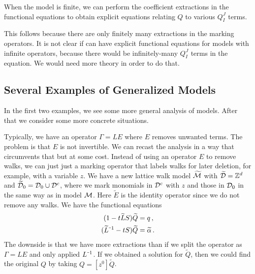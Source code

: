 \begin{cor} When the model is finite, we can perform the coefficient extractions in the functional equations to obtain explicit equations relating $Q$ to various $Q_I^J$ terms.
\end{cor}

This follows because there are only finitely many extractions in the marking operators. It is not clear if can have explicit functional equations for models with infinite operators, because there would be infinitely-many $Q_I^J$ terms in the equation. We would need more theory in order to do that.

\subsection{Several Examples of Generalized Models}

In the first two examples, we see some more general analysis of models. After that we consider some more concrete situations.

\begin{exa} Typically, we have an operator $\Gamma = LE$ where $E$ removes unwanted terms. The problem is that $E$ is not invertible. We can recast the analysis in a way that circumvents that but at some cost. Instead of using an operator $E$ to remove walks, we can just just a marking operator that labels walks for later deletion, for example, with a variable $z$. We have a new lattice walk model $\widetilde{\mathcal{M}}$ with $\widetilde{\mathcal{D}} = \mathbb{Z}^d$ and $\widetilde{\mathcal{D}}_0 = \mathcal{D}_0  \cup \mathcal{D}^c$, where we mark monomials in $\mathcal{D}^c$ with $z$ and those in $\mathcal{D}_0 $ in the same way as in model $\mathcal{M}$. Here $\widetilde{E}$ is the identity operator since we do not remove any walks. We have the functional equations
\begin{align}
	(1-t\widetilde{L} S)\widetilde Q &= q\,,\\
	(\widetilde{L}^{\um 1}-t S) \widetilde Q &= \widetilde{\alpha}\,.
\end{align}
The downside is that we have more extractions  than if we split the operator as $\Gamma = LE$ and only applied $L^{\um 1}$. If we obtained a solution for $\widetilde Q$, then we could find the original $Q$ by taking $Q = [z^0]\widetilde Q$.
\end{exa}

